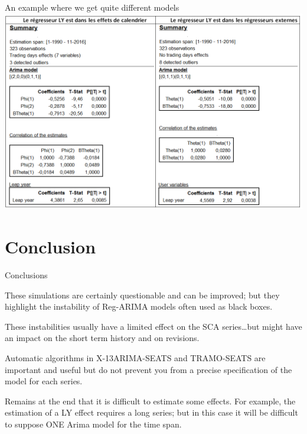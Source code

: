 \documentclass[10pt]{beamer}
\begin{document}
\begin{frame}{An example where we get quite different models}
\centering
\includegraphics[width = \textwidth]{img/CholeskyRF241.png}
\end{frame}

\section{Conclusion}
\begin{frame}{Conclusions}

\bcinfo These simulations are certainly questionable and can be improved; but they highlight the instability of Reg-ARIMA models often used as black boxes.

\medskip  \pause
\bcsmbh These instabilities usually have a limited effect on the SCA series\dots \bcsmmh but might have an impact on the
short term history and on revisions.

\medskip  \pause
\bcattention Automatic algorithms in X-13ARIMA-SEATS and TRAMO-SEATS are important and  useful but do not prevent you from a precise specification of the model for each series.

\medskip  \pause
\bcattention Remains at the end that it is difficult to estimate some effects. For example, the estimation of a LY effect requires a long series; but in this case it will be difficult to suppose ONE Arima model for the time span.


\end{frame}
\end{document}

